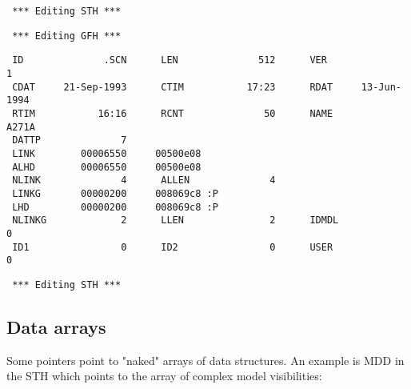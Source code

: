 \spbegin %
\svbegin \begin{verbatim} 
 *** Editing STH *** 
\end{verbatim}\svend 
%
%
\svbegin \begin{verbatim} 
 *** Editing GFH *** 
\end{verbatim} 
\svend 
\spend %
%
\spbegin %
\suser{*} 
%
\svbegin \begin{verbatim} 
 ID              .SCN      LEN              512      VER                1
 CDAT     21-Sep-1993      CTIM           17:23      RDAT     13-Jun-1994 
 RTIM           16:16      RCNT              50      NAME           A271A
 DATTP              7
 LINK        00006550     00500e08 
 ALHD        00006550     00500e08 
 NLINK              4      ALLEN              4
 LINKG       00000200     008069c8 :P 
 LHD         00000200     008069c8 :P 
 NLINKG             2      LLEN               2      IDMDL              0
 ID1                0      ID2                0      USER               0

\end{verbatim} 
\svend 
\spend %
%
\spbegin %
\suser{\scr} 
%
\svbegin \begin{verbatim} 
 *** Editing STH *** 
\end{verbatim} 
\svend 
\spend %


\subsection{ Data arrays} 
\label{.data.arrays} 

	Some pointers point to "naked" arrays of data structures.  An example
is MDD in the STH which points to the array of complex model visibilities: 

